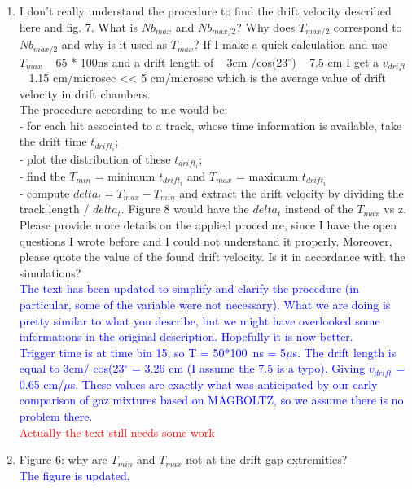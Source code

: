 \documentclass[a4paper,11pt,twoside]{article}
\begin{document}
\begin{enumerate}
\item I don't really understand the procedure to find the drift velocity 
   described here and fig. 7. What is $Nb_{max}$ and $Nb_{max/2}$? Why does 
   $T_{max/2}$ correspond to $Nb_{max/2}$ and why is it used as $T_{max}$? If I 
   make a quick calculation and use $T_{max}$ ~ 65 * 100ns and a drift length 
   of ~ 3cm /cos(23$^{\circ}$) ~ 7.5 cm I get a $v_{drift}$ ~ 1.15 cm/microsec 
   << 5 cm/microsec which is the average value of drift velocity in drift 
   chambers.\\
The procedure according to me would be:\\
- for each hit associated to a track, whose time information is available, take 
the drift time $t_{drift_{i}}$;\\
- plot the distribution of these $t_{drift_{i}}$;\\
- find the $T_{min}$ = minimum $t_{drift_{i}}$ and $T_{max}$ = maximum 
$t_{drift_{i}}$\\
- compute $delta_{t} = T_{max} - T_{min}$ and extract the drift velocity by 
dividing the track length / $delta_{t}$. Figure 8 would have the $delta_{t}$ 
instead of the $T_{max}$ vs z.\\
Please provide more details on the applied procedure, since I have the open 
questions I wrote before and I could not understand it properly. Moreover, 
please quote the value of the found drift velocity. Is it in accordance with 
the simulations?\\
\textcolor{blue}{The text has been updated to simplify and clarify the procedure 
(in particular, some of the variable were not necessary). What we are doing is pretty 
similar to what you describe, but we might have overlooked some informations in the
original description. Hopefully it is now better.\\
Trigger time is at time bin 15, so T = 50*100~ns = 5$\mu$s.
The drift length is equal to 3cm/ cos(23$^{\circ}$ = 3.26 cm (I assume the 7.5 is a typo).
Giving $v_{drift}$ = 0.65 cm/$\mu$s. These values are exactly what was anticipated by
our early comparison of gaz mixtures based on MAGBOLTZ, so we assume there is no 
problem there.\\} 
\textcolor{red}{Actually the text still needs some work}

\item Figure 6: why are $T_{min}$ and $T_{max}$ not at the drift gap 
   extremities?\\
   \textcolor{blue}{The figure is updated.} 


\end{enumerate}
\end{document}
